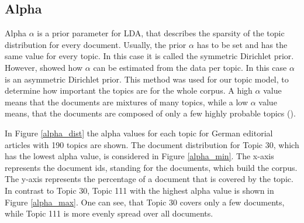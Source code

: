 \subsection{Alpha}
Alpha $\alpha$ is a prior parameter for \ac{LDA}, that describes the sparsity of the topic distribution for every document. Usually, the prior $\alpha$ has to be set and has the same value for every topic. In this case it is called the symmetric Dirichlet prior. However, \cite{Blei2003} showed how $\alpha$ can be estimated from the data per topic. In this case $\alpha$ is an asymmetric Dirichlet prior. This method was used for our topic model, to determine how important the topics are for the whole corpus. A high $\alpha$ value means that the documents are mixtures of many topics, while a low $\alpha$ value means, that the documents are composed of only a few highly probable topics (\cite{Steyvers2007}).

In Figure \ref{alpha_dist} the alpha values for each topic for German editorial articles with 190 topics are shown. The document distribution for Topic 30, which has the lowest alpha value, is considered in Figure \ref{alpha_min}. The x-axis represents the document ids, standing for the documents, which build the corpus. The y-axis represents the percentage of a document that is covered by the topic. In contrast to Topic 30, Topic 111 with the highest alpha value is shown in Figure \ref{alpha_max}. One can see, that Topic 30 covers only a few documents, while Topic 111 is more evenly spread over all documents.

